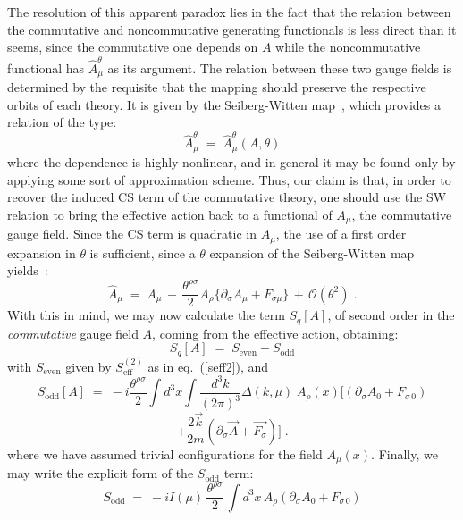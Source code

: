 \documentclass[a4paper,12pt]{article}
\begin{document}
The resolution of this apparent paradox lies in the fact that the
relation between the commutative and noncommutative generating
functionals is less direct than it seems, since the commutative one
depends on $A$ while the noncommutative functional has ${\widehat
  A}^\theta_\mu$ as its argument.  The relation between these two gauge
fields is determined by the requisite that the mapping should preserve
the respective orbits of each theory. It is given by the
Seiberg-Witten map~\cite{seibergwitten}, which provides a relation of
the type:
\begin{equation}
{\widehat A}^\theta_\mu \;=\; {\widehat A}^\theta_\mu(A,\theta)
\end{equation}
where the dependence is highly nonlinear, and in general it may be
found only by applying some sort of approximation scheme. Thus, our
claim is that, in order to recover the induced CS term of the
commutative theory, one should use the SW relation to bring the
effective action back to a functional of $A_\mu$, the commutative gauge
field. Since the CS term is quadratic in $A_\mu$, the use of a first
order expansion in $\theta$ is sufficient, since a $\theta$ expansion of the
Seiberg-Witten map yields~\cite{seibergwitten,bichletal}:
\begin{equation}
\widehat{A}_\mu \;=\; A_\mu \,-\, \frac{\theta^{\rho\sigma}}{2} A_\rho 
\{\partial_\sigma A_\mu + F_{\sigma\mu} \}\,+\,{\mathcal O}(\theta^2) \;.
\end{equation}
With this in mind, we may now calculate the term $S_q[A]$,  of second order 
in the {\em commutative\/} gauge field $A$, coming from the  effective action, 
obtaining:
\begin{equation}
S_q[A]\;=\; S_{\mathrm{even}} + S_{\mathrm{odd}}
\end{equation}
with $S_{\mathrm{even}}$ given by $S_{\mathrm{eff}}^{(2)}$ as in eq.~(\ref{seff2}),
 and
%
$$
S_{\mathrm{odd}}[A] \;=\; -i \frac{\theta ^ {\rho \sigma}}{2}  
\int d^3x \int \frac{d^3k}{(2\pi)^3} \Delta (k,\mu)\;
A_\rho(x) [ (\partial_\sigma A_0 +F_{\sigma\,0})
$$
\begin{equation}
+ \frac{2\vec{k}}{2m} (\partial_\sigma \vec{A} + \vec{F_\sigma})] 
\;.
\end{equation}
where we have assumed trivial configurations for the field $A_\mu(x)$. 
Finally, we may write the explicit form of the $S_{\mathrm{odd}}$ term:
\begin{equation}
 S_{\mathrm{odd}} \;=\; - i I(\mu) \, \frac{\theta ^ {\rho \sigma}}{2} \, 
\int d^3x \, A_\rho (\partial_\sigma A_0 +F_{\sigma\,0}) 
\end{equation}
\end{document}
